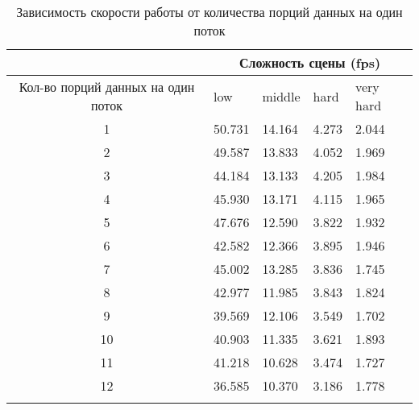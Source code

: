 \begin{center}
\begin{longtable}{|c|p{2cm}|p{2cm}|p{2cm}|p{2cm}|}
\hline & \multicolumn{4}{c|}{Сложность сцены (fps)} \\ 
\hline Кол-во порций данных на один поток & low & middle & hard &  very hard\\ 
\hline 1 &  50.731 & 14.164 & 4.273 & 2.044 \\ 
\hline 2 &  49.587 & 13.833 & 4.052 & 1.969 \\ 
\hline 3 &  44.184 & 13.133 & 4.205 & 1.984 \\ 
\hline 4 &  45.930 & 13.171 & 4.115 & 1.965 \\ 
\hline 5 &  47.676 & 12.590 & 3.822 & 1.932 \\ 
\hline 6 &  42.582 & 12.366 & 3.895 & 1.946 \\ 
\hline 7 &  45.002 & 13.285 & 3.836 & 1.745 \\ 
\hline 8 &  42.977 & 11.985 & 3.843 & 1.824 \\ 
\hline 9 &  39.569 & 12.106 & 3.549 & 1.702 \\ 
\hline 10 &  40.903 & 11.335 & 3.621 & 1.893 \\ 
\hline 11 &  41.218 & 10.628 & 3.474 & 1.727 \\ 
\hline 12 &  36.585 & 10.370 & 3.186 & 1.778 \\ 
\hline
\caption{Зависимость скорости работы от количества порций данных на один поток}\label{tab:performance_gs}\end{longtable}
\end{center}

